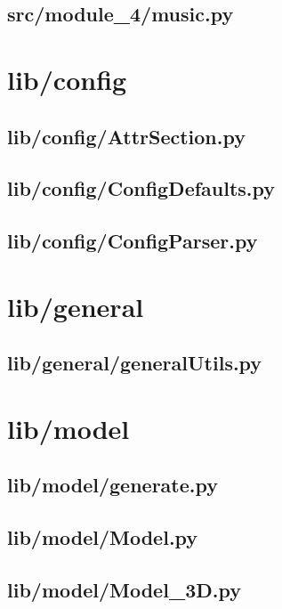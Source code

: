 \subsection*{src/module\_4/music.py}
\label{ap:music}
\section{lib/config}
\subsection*{lib/config/AttrSection.py}
\label{ap:AttrSection}
\subsection*{lib/config/ConfigDefaults.py}
\label{ap:ConfigDefaults}
\subsection*{lib/config/ConfigParser.py}
\label{ap:ConfigParser}
\section{lib/general}
\subsection*{lib/general/generalUtils.py}
\label{ap:generalUtils}
\section{lib/model}
\subsection*{lib/model/generate.py}
\label{ap:generate}
\subsection*{lib/model/Model.py}
\label{ap:Model}
\subsection*{lib/model/Model\_3D.py}
\label{ap:Model_3D}
